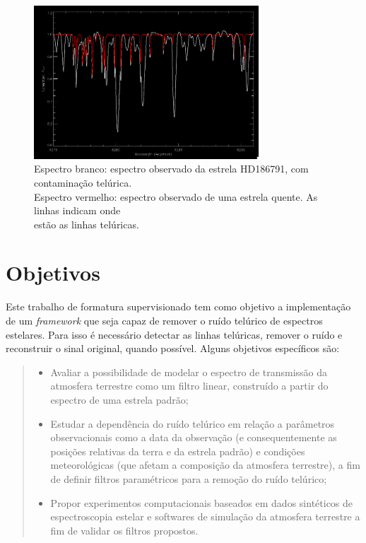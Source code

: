 \documentclass[11pt,twoside,a4paper]{article}
\begin{document}
\begin{figure}[h!]
  \centering
  \includegraphics[width=0.75\textwidth]{telluric_spectrum.png}
  \caption[Espectro branco: espectro observado da estrela HD186791, com contaminação telúrica. Espectro vermelho: espectro observado de uma estrela quente, as linhas indicam onde estão as linhas telúricas.]
    {Espectro branco: espectro observado da estrela HD186791, com contaminação telúrica. \\ Espectro vermelho: espectro observado de uma estrela quente. As linhas indicam onde \\estão as linhas telúricas.\endtabular}
\end{figure}

\section{Objetivos}
\doublespacing
Este trabalho de formatura supervisionado tem como objetivo a implementação  de um \textit{framework} que seja capaz de remover o ruído telúrico de espectros estelares. Para isso é necessário detectar as linhas telúricas, remover o ruído e reconstruir o sinal original, quando possível. Alguns objetivos específicos são:
\newpage
\begin{quote}\begin{itemize}
    \item Avaliar a possibilidade de modelar o espectro de transmissão da atmosfera terrestre como um filtro linear, construído a partir do espectro de uma estrela padrão;
    \item Estudar a dependência do ruído telúrico em relação a parâmetros observacionais como a data da observação (e consequentemente as posições relativas da terra e da estrela padrão) e condições meteorológicas (que afetam a composição da atmosfera terrestre), a fim de definir filtros paramétricos para a remoção do ruído telúrico;
    \item Propor experimentos computacionais baseados em dados sintéticos de espectroscopia estelar e softwares de simulação da atmosfera terrestre \cite{bertaux2014tapas} a fim de validar os filtros propostos.
\end{itemize}\end{quote}
\end{document}

